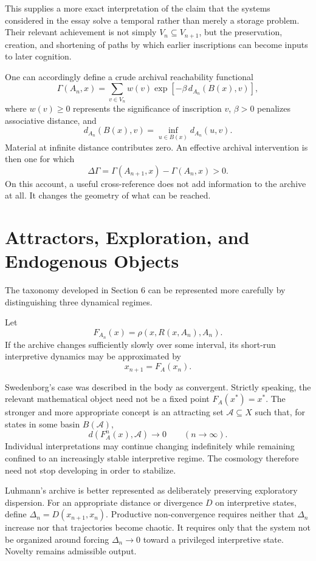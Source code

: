 \documentclass[11pt]{article}
\begin{document}
This supplies a more exact interpretation of the claim that the systems considered in the essay solve a temporal rather than merely a storage problem. Their relevant achievement is not simply $V_n \subseteq V_{n+1}$, but the preservation, creation, and shortening of paths by which earlier inscriptions can become inputs to later cognition.

One can accordingly define a crude archival reachability functional
\[
\Gamma(A_n, x) = \sum_{v \in V_n} w(v) \exp\!\left[-\beta\, d_{A_n}(B(x), v)\right],
\]
where $w(v) \geq 0$ represents the significance of inscription $v$, $\beta > 0$ penalizes associative distance, and
\[
d_{A_n}(B(x), v) = \inf_{u \in B(x)} d_{A_n}(u,v).
\]
Material at infinite distance contributes zero. An effective archival intervention is then one for which
\[
\Delta\Gamma = \Gamma(A_{n+1}, x) - \Gamma(A_n, x) > 0.
\]
On this account, a useful cross-reference does not add information to the archive at all. It changes the geometry of what can be reached.

\section{Attractors, Exploration, and Endogenous Objects}

The taxonomy developed in Section 6 can be represented more carefully by distinguishing three dynamical regimes.

Let
\[
F_{A_n}(x) = \rho\!\left(x, R(x, A_n), A_n\right).
\]
If the archive changes sufficiently slowly over some interval, its short-run interpretive dynamics may be approximated by
\[
x_{n+1} = F_A(x_n).
\]

Swedenborg's case was described in the body as convergent. Strictly speaking, the relevant mathematical object need not be a fixed point $F_A(x^\ast) = x^\ast$. The stronger and more appropriate concept is an attracting set $\mathcal{A} \subseteq X$ such that, for states in some basin $B(\mathcal{A})$,
\[
d\!\left(F_A^n(x), \mathcal{A}\right) \longrightarrow 0 \qquad (n \to \infty).
\]
Individual interpretations may continue changing indefinitely while remaining confined to an increasingly stable interpretive regime. The cosmology therefore need not stop developing in order to stabilize.

Luhmann's archive is better represented as deliberately preserving exploratory dispersion. For an appropriate distance or divergence $D$ on interpretive states, define $\Delta_n = D(x_{n+1}, x_n)$. Productive non-convergence requires neither that $\Delta_n$ increase nor that trajectories become chaotic. It requires only that the system not be organized around forcing $\Delta_n \to 0$ toward a privileged interpretive state. Novelty remains admissible output.
\end{document}
